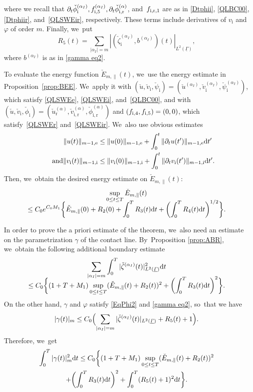 \documentclass[10pt]{amsart}
\newcommand{\dt}{\partial_t}
\newcommand{\ul}[1]{\underline{#1}}
\newcommand{\itGamma}{\mathit{\Gamma}}
\theoremstyle{definition}
\begin{document}
where we recall that $\dt\check{\phi}_\mathrm{i}^{(\alpha_I)},f_{{\rm i},5}^{(\alpha_I)},\dt\check{\phi}_\mathrm{i,r}^{(\alpha)}$,
and~$f_{{\rm i,r},1}$ are as in \eqref{Dtphii}, \eqref{QLBC00}, \eqref{Dtphiir}, and~\eqref{QLSWEir}, respectively.
These terms include derivatives of $v_\mathrm{i}$ and $\varphi$ of order $m$.
Finally, we~put
\[
R_5(t) = \sum_{|\alpha_I|=m} |(\check{\zeta}_\mathrm{i}^{(\alpha_I)},b^{(\alpha_I)})(t)|_{L^2(\ul{\itGamma})},
\]
where $b^{(\alpha_I)}$ is as in \eqref{gamma eq2}.

To evaluate the energy function $\check{E}_{m,\parallel}(t)$, we~use the energy estimate in Proposition~\ref{prop:BEE}. We~apply it with $(\check{u},\check{v}_\mathrm{i},\check{\psi}_\mathrm{i})=(\check{u}^{(\alpha_I)},\check{v}_\mathrm{i}^{(\alpha_I)},\check{\psi}_\mathrm{i}^{(\alpha_I)})$,
which satisfy \eqref{QLSWEe}, \eqref{QLSWEi}, and~\eqref{QLBC00},
and with $(\check{u},\check{v}_\mathrm{i},\check{\phi}_\mathrm{i})=(\check{u}_\mathrm{r}^{(\alpha)},\check{v}_\mathrm{i,r}^{(\alpha)},\check{\phi}_\mathrm{i,r}^{(\alpha)})$
and $(f_{{\rm i},4},f_{{\rm i},5})=(0,0)$, which satisfy~\eqref{QLSWEr} and~\eqref{QLSWEir}. We~also use obvious estimates
\begin{align*}
\|u(t)\|_{m-1,{\rm e}} &\leq \|u(0)\|_{m-1,{\rm e}}+\int_0^t\|\dt u(t')\|_{m-1,{\rm e}}{\rm d}t'\\
\tag*{and}
\|v_\mathrm{i}(t)\|_{m-1,{\rm i}} &\leq \|v_\mathrm{i}(0)\|_{m-1,{\rm i}}+\int_0^t\|\dt v_\mathrm{i}(t')\|_{m-1,{\rm i}}{\rm d}t'.
\end{align*}
Then, we~obtain the desired energy estimate on $\check{E}_{m,\parallel}(t)$:
\begin{multline}\label{NLEE1}
\sup_{0\leq t\leq T}\check{E}_{m,\parallel}(t)\\[-8pt]
\leq C_0 e^{C_0M_1}\biggl\{ \check{E}_{m,\parallel}(0) + R_2(0) + \int_0^TR_3(t){\rm d}t + \biggl(\int_0^TR_4(t){\rm d}t \biggr)^{1/2} \biggr\}.
\end{multline}

In order to prove the a priori estimate of the theorem, we~also need an estimate on the parametrization $\gamma$ of the contact line. By~Proposition \ref{prop:ABR}, we~obtain the following additional boundary estimate
\begin{multline*}
\sum_{|\alpha_I|=m} \int_0^T |\check{\zeta}^{(\alpha_I)}(t)|_{L^2(\ul{\itGamma})}^2 {\rm d}t \\[-8pt]
\leq C_0\biggl\{ (1+T+M_1)\sup_{0\leq t\leq T}(\check{E}_{m,\parallel}(t) + R_2(t))^2 + \biggl(\int_0^TR_3(t){\rm d}t \biggr)^2 \biggr\}.
\end{multline*}
On the other hand, $\gamma$ and $\varphi$ satisfy \eqref{EqPhi2} and \eqref{gamma eq2}, so~that we have
\[
|\gamma(t)|_m \leq C_0\Bigl(\sum_{|\alpha_I|=m}|\check{\zeta}^{(\alpha_I)}(t)|_{L^2(\ul{\itGamma})} + R_5(t) + 1\Bigr).
\]
Therefore, we~get
\begin{multline}\label{NLEE2}
\int_0^T|\gamma(t)|_m^2{\rm d}t
\leq C_0 \biggl\{ (1+T+M_1)\sup_{0\leq t\leq T}(\check{E}_{m,\parallel}(t) + R_2(t))^2 \\
+ \biggl(\int_0^TR_3(t){\rm d}t \biggr)^2 + \int_0^T (R_5(t) + 1)^2{\rm d}t \biggr\}.
\end{multline}
\end{document}
